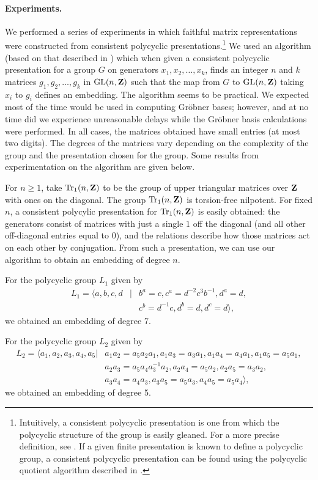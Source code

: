 \paragraph{Experiments.}
We performed a series of experiments 
in which faithful matrix representations were constructed 
from consistent polycyclic presentations.\footnote{Intuitively,
a consistent polycyclic presentation is one from which the
polycyclic structure of the group is easily gleaned.
For a more precise definition, see \cite{Sims}.
If a given finite presentation is known to define a polycyclic
group, a consistent polycyclic presentation can be found
using the polycyclic quotient algorithm described in \cite{Lo:jscpqa}.}
We used an algorithm (based on that described in \cite{GO:thesis})
which when given a consistent polycyclic presentation for a group
$G$ on generators
$x_1, x_2, \ldots, x_k$, finds an integer $n$
and $k$ matrices $g_1, g_2, \ldots, g_k$ in $\mbox{GL} (n,{\bf Z})$
such that the map from $G$ to $\mbox{GL} (n,{\bf Z})$
taking $x_i$ to $g_i$ defines an embedding.
The algorithm seems to be practical.
We expected most of the time would be used in
computing Gr\"obner bases; however,
and at no time did we experience unreasonable delays
while the Gr\"{o}bner basis calculations were performed.
In all cases, the matrices obtained have small entries
(at most two digits).
The degrees of the matrices vary depending on 
the complexity of the group and the presentation
chosen for the group. Some results from experimentation
on the algorithm are given below.

For $n\ge1$, take $\mbox{Tr}_1(n,{\bf Z})$ to be
the group of upper triangular matrices
over ${\bf Z}$ with ones on the diagonal. The group $\mbox{Tr}_1(n,{\bf Z})$ is
torsion-free nilpotent. For fixed $n$,
a consistent polycylic presentation for $\mbox{Tr}_1(n,{\bf Z})$ is easily obtained:
the generators consist of matrices with just a single $1$ off the diagonal
(and all other off-diagonal entries equal to $0$),
and the relations describe how those matrices act on each other by
conjugation.
From such a presentation, we can use our algorithm to
obtain an embedding of degree
$n$. 

For the polycyclic group $L_1$ given by 
\begin{eqnarray*}
L_1 = \langle a, b, c, d & | & b ^ a = c, 
c^a = d^{-2} c^3 b^{-1}, d ^ a = d, \\
& & c^b = d^{-1}c, d^b = d, d^c = d \rangle,
\end{eqnarray*}
we obtained an embedding of degree 7.

For the polycyclic group $L_2$ given by
\begin{eqnarray*}
L_2 = \langle a_1,a_2,a_3,a_4,a_5 | & a_1a_2 = a_5a_2a_1,a_1a_3=a_3a_1,
a_1a_4=a_4a_1,a_1a_5=a_5a_1,\\
& a_2a_3=a_5a_4a_3^{-1}a_2,
a_2a_4=a_5a_2,a_2a_5=a_3a_2,\\
& a_3a_4=a_4a_3,a_3a_5=a_5a_3,
a_4a_5=a_5a_4\rangle,
\end{eqnarray*}
we obtained an embedding of degree 5.

